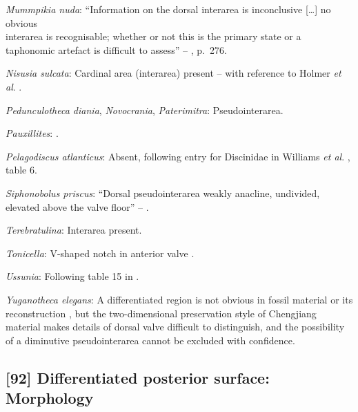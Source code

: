 \documentclass[openany]{book}
\begin{document}
\hypertarget{Mummpikia_nuda-coding-91}{}
\emph{Mummpikia nuda}: ``Information on the dorsal interarea is
inconclusive {[}\ldots{}{]} no obvious\\
interarea is recognisable; whether or not this is the primary state or a
taphonomic artefact is difficult to assess'' --
\citet{Balthasar2008iMummpikia}, p.~276.

\hypertarget{Nisusia_sulcata-coding-91}{}
\emph{Nisusia sulcata}: Cardinal area (interarea) present -- with
reference to Holmer \emph{et al}.
\citeyearpar{Holmer2018Evolutionarysignificance}.

\hypertarget{Novocrania-coding-91}{}
\emph{Pedunculotheca diania}, \emph{Novocrania}, \emph{Paterimitra}:
Pseudointerarea.

\hypertarget{Pauxillites-coding-91}{}
\emph{Pauxillites}: \citet{Marek1966}.

\hypertarget{Pelagodiscus_atlanticus-coding-91}{}
\emph{Pelagodiscus atlanticus}: Absent, following entry for Discinidae
in Williams \emph{et al}.
\citeyearpar{Williams2000LinguliformeaCraniiformea}, table 6.

\hypertarget{Siphonobolus_priscus-coding-91}{}
\emph{Siphonobolus priscus}: ``Dorsal pseudointerarea weakly anacline,
undivided, elevated above the valve floor'' --
\citet{Popov2009Earlyontogeny}.

\hypertarget{Terebratulina-coding-91}{}
\emph{Terebratulina}: Interarea present.

\hypertarget{Tonicella-coding-91}{}
\emph{Tonicella}: V-shaped notch in anterior valve \citep{Schwabe2010}.

\hypertarget{Ussunia-coding-91}{}
\emph{Ussunia}: Following table 15 in
\citet{Williams2000LinguliformeaCraniiformea}.

\hypertarget{Yuganotheca_elegans-coding-91}{}
\emph{Yuganotheca elegans}: A differentiated region is not obvious in
fossil material or its reconstruction \citep{Zhang2014Anearly}, but the
two-dimensional preservation style of Chengjiang material makes details
of dorsal valve difficult to distinguish, and the possibility of a
diminutive pseudointerarea cannot be excluded with confidence.

\subsection*{{[}92{]} Differentiated posterior surface:
Morphology}\label{differentiated-posterior-surface-morphology}
\end{document}
